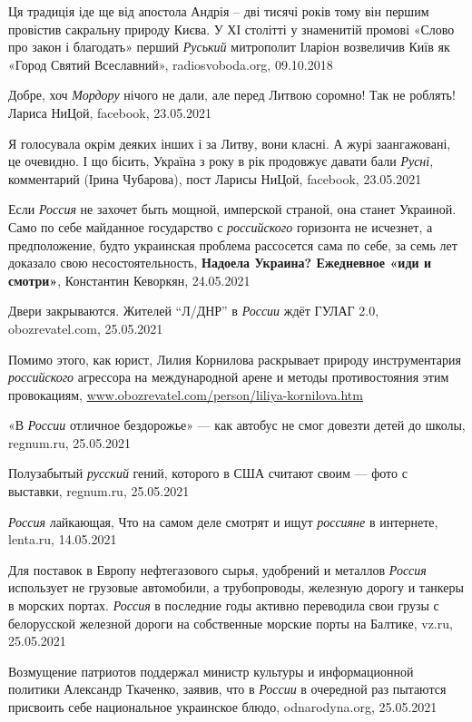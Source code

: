 Ця традиція іде ще від апостола Андрія – дві тисячі років тому він першим
провістив сакральну природу Києва. У ХІ столітті у знаменитій промові «Слово
про закон і благодать» перший \emph{Руський} митрополит Іларіон возвеличив Київ
як «Город Святий Всеславний», radiosvoboda.org, 09.10.2018

Добре, хоч \emph{Мордору} нічого не дали, але перед Литвою соромно! Так не
роблять! Лариса НиЦой, facebook, 23.05.2021

Я голосувала окрім деяких інших і за Литву, вони класні. А журі заангажовані,
це очевидно. І що бісить, Україна з року в рік продовжує давати бали
\emph{Русні}, комментарий (Ірина Чубарова), пост Ларисы НиЦой, facebook,
23.05.2021

Если \emph{Россия} не захочет быть мощной, имперской страной, она станет
Украиной. Само по себе майданное государство с \emph{российского} горизонта не
исчезнет, а предположение, будто украинская проблема рассосется сама по себе,
за семь лет доказало свою несостоятельность, \textbf{Надоела Украина? Ежедневное «иди и
смотри»}, Константин Кеворкян, 24.05.2021

Двери закрываются. Жителей \enquote{Л/ДНР} в \emph{России} ждёт ГУЛАГ 2.0,
obozrevatel.com, 25.05.2021

Помимо этого, как юрист, Лилия Корнилова раскрывает природу инструментария
\emph{российского} агрессора на международной арене и методы противостояния
этим провокациям, \url{www.obozrevatel.com/person/liliya-kornilova.htm}

«В \emph{России} отличное бездорожье» — как автобус не смог довезти детей до
школы, regnum.ru, 25.05.2021

Полузабытый \emph{русский} гений, которого в США считают своим — фото с
выставки, regnum.ru, 25.05.2021

\emph{Россия} лайкающая, Что на самом деле смотрят и ищут \emph{россияне} в
интернете, lenta.ru, 14.05.2021

Для поставок в Европу нефтегазового сырья, удобрений и металлов \emph{Россия}
использует не грузовые автомобили, а трубопроводы, железную дорогу и танкеры в
морских портах. \emph{Россия} в последние годы активно переводила свои грузы с
белорусской железной дороги на собственные морские порты на Балтике, vz.ru,
25.05.2021

Возмущение патриотов поддержал министр культуры и информационной политики
Александр Ткаченко, заявив, что в \emph{России} в очередной раз пытаются
присвоить себе национальное украинское блюдо, odnarodyna.org, 25.05.2021

